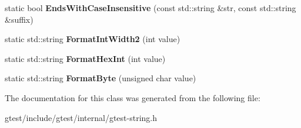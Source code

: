\begin{DoxyCompactItemize}
\mbox{\label{classtesting_1_1internal_1_1String_a3de1df085eddc89ef3f3833c67aee3fe}} 
static bool {\bfseries Ends\+With\+Case\+Insensitive} (const std\+::string \&str, const std\+::string \&suffix)
\item 
\mbox{\label{classtesting_1_1internal_1_1String_a51cab855f7ec6091e5886b6be5598ca2}} 
static std\+::string {\bfseries Format\+Int\+Width2} (int value)
\item 
\mbox{\label{classtesting_1_1internal_1_1String_a7bedf4780e0c938d203b73ddb17ff490}} 
static std\+::string {\bfseries Format\+Hex\+Int} (int value)
\item 
\mbox{\label{classtesting_1_1internal_1_1String_ab3555eeb6abe4b7c6f63d865af10379d}} 
static std\+::string {\bfseries Format\+Byte} (unsigned char value)
\end{DoxyCompactItemize}


The documentation for this class was generated from the following file\+:\begin{DoxyCompactItemize}
\item 
gtest/include/gtest/internal/gtest-\/string.\+h\end{DoxyCompactItemize}
